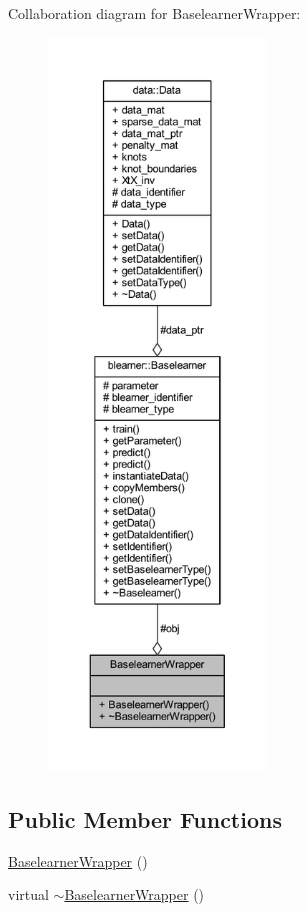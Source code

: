 Collaboration diagram for Baselearner\+Wrapper\+:\nopagebreak
\begin{figure}[H]
\begin{center}
\leavevmode
\includegraphics[height=550pt]{class_baselearner_wrapper__coll__graph}
\end{center}
\end{figure}
\subsection*{Public Member Functions}
\begin{DoxyCompactItemize}
\item 
\mbox{\hyperlink{class_baselearner_wrapper_a949efebe239360548b02a211b649d6d8}{Baselearner\+Wrapper}} ()
\item 
virtual \mbox{\hyperlink{class_baselearner_wrapper_a2dcf0b1a75179c3a2104b70138f88dc7}{$\sim$\+Baselearner\+Wrapper}} ()
\end{DoxyCompactItemize}
